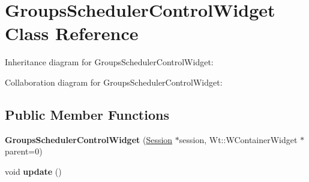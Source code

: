 \hypertarget{classGroupsSchedulerControlWidget}{}\section{Groups\+Scheduler\+Control\+Widget Class Reference}
\label{classGroupsSchedulerControlWidget}


Inheritance diagram for Groups\+Scheduler\+Control\+Widget\+:


Collaboration diagram for Groups\+Scheduler\+Control\+Widget\+:
\subsection*{Public Member Functions}
\begin{DoxyCompactItemize}
\item 
{\bfseries Groups\+Scheduler\+Control\+Widget} (\hyperlink{classSession}{Session} $\ast$session, Wt\+::\+W\+Container\+Widget $\ast$parent=0)\hypertarget{classGroupsSchedulerControlWidget_a913ff60671d49cfe09aafe9f5f89e7f4}{}\label{classGroupsSchedulerControlWidget_a913ff60671d49cfe09aafe9f5f89e7f4}

\item 
void {\bfseries update} ()\hypertarget{classGroupsSchedulerControlWidget_afd0603c2ef11ccf5ac6a8812f0a6fd07}{}\label{classGroupsSchedulerControlWidget_afd0603c2ef11ccf5ac6a8812f0a6fd07}

\end{DoxyCompactItemize}

